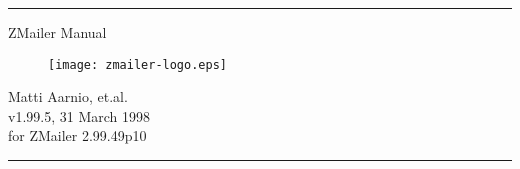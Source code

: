 \documentclass[twoside,a4paper]{article}
\begin{document}
\startdocument

\begin{titlepage}

\hrule
\begin{center}

{\Large \vspace{4ex}}
{\Large ZMailer Manual} \\
{\Large \vspace{4ex}}

\begin{figure}[h]
  \texttt{[image: zmailer-logo.eps]}
\end{figure}

{\Large \vspace{4ex}}
{\large Matti Aarnio, et.al.} \\
{\large \vspace{4ex}}
{v1.99.5, 31 March 1998} \\
{for ZMailer 2.99.49p10}
\end{center}
\vfill
\hrule

\end{titlepage}

\cleardoublepage
\end{document}
